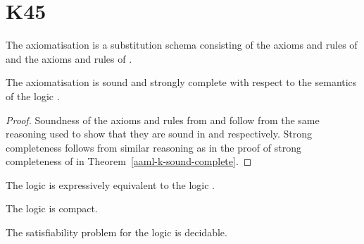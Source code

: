 \section{K45}

\begin{definition}
The axiomatisation \axiomAamlKFF{} is a substitution schema consisting of the axioms and rules of \axiomAmlKFF{} and the axioms and rules of \axiomRmlKFF{}.
\end{definition}

\begin{theorem}
The axiomatisation \axiomRmlKFF{} is sound and strongly complete with respect to the semantics of the logic \logicAamlKFF{}.
\end{theorem}

\begin{proof}
Soundness of the axioms and rules from \axiomAmlKFF{} and \axiomRmlKFF{} follow from the same reasoning used to show that they are sound in \logicAmlKFF{} and \logicRmlKFF{} respectively.
Strong completeness follows from similar reasoning as in the proof of strong completeness of \axiomAamlK{} in Theorem~\ref{aaml-k-sound-complete}.
\end{proof}

\begin{corollary}
The logic \logicAamlKFF{} is expressively equivalent to the logic \logicKFF{}.
\end{corollary}

\begin{corollary}
The logic \logicAamlKFF{} is compact.
\end{corollary}

\begin{corollary}
The satisfiability problem for the logic \logicAamlKFF{} is decidable.
\end{corollary}

